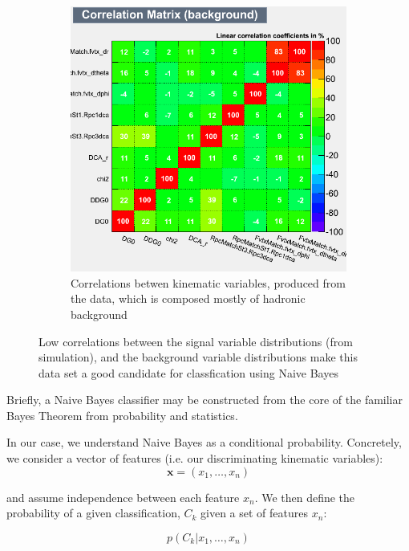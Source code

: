 \begin{figure}[H]
\begin{subfigure}{0.5\textwidth}
		\includegraphics[width=0.95\linewidth]{../Chapter5/fig/CorrelationMatrix_Background.png}
		\caption{Correlations betwen kinematic variables, produced from the data,
			which is composed mostly of hadronic background}
		\label{fig:corr_mat_bkg}
	\end{subfigure}
	\caption{ Low correlations between the signal variable distributions (from
		simulation), and the background variable distributions make this data set a
		good candidate for classfication using Naive Bayes}
	\label{fig:kinematic_var_correlations}
\end{figure}

Briefly, a Naive Bayes classifier may be constructed from the core of the
familiar Bayes Theorem from probability and statistics.

In our case, we understand Naive Bayes as a conditional probability. Concretely,
we consider a vector of features (i.e. our discriminating kinematic variables):
\begin{equation}
	\label{eq:feature_vector}
\mathbf{x} = (x_1, \dots, x_n)
\end{equation}

and assume independence between each feature $x_n$. We then define the
probability of a given classification, $C_k$ given a set of features $x_n$:

\begin{equation}
	\label{eq:cond_probabilty}
p(C_k \vert x_1, \dots, x_n)
\end{equation}

